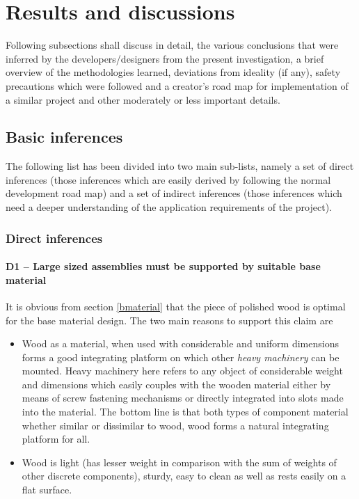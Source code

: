 \chapter{Results and discussions} \label{chapter6}

Following subsections shall discuss in detail, the various conclusions that were inferred by the developers/designers from the present investigation, a brief overview of the methodologies learned, deviations from ideality (if any), safety precautions which were followed and a creator’s road map for implementation of a similar project and other moderately or less important details.


\section{Basic inferences}

The following list has been divided into two main sub-lists, namely a set of direct inferences (those inferences which are easily derived by following the normal development road map) and a set of indirect inferences (those inferences which need a deeper understanding of the application requirements of the project).

\subsection{Direct inferences}

\subsubsection*{D1 – Large sized assemblies must be supported by suitable base material} 

It is obvious from section \ref{bmaterial} that the piece of polished wood is optimal for the base material design. The two main reasons to support this claim are

\begin{itemize}
 \item Wood as a material, when used with considerable and uniform dimensions forms a good integrating platform on which other \textit{heavy machinery} can be mounted. Heavy machinery here refers to any object of considerable weight and dimensions which easily couples with the wooden material either by means of screw fastening mechanisms or directly integrated into slots made into the material. The bottom line is that both types of component material whether similar or dissimilar to wood, wood forms a natural integrating platform for all.
 \item Wood is light (has lesser weight in comparison with the sum of weights of other discrete components), sturdy, easy to clean as well as rests easily on a flat surface.
\end{itemize}

